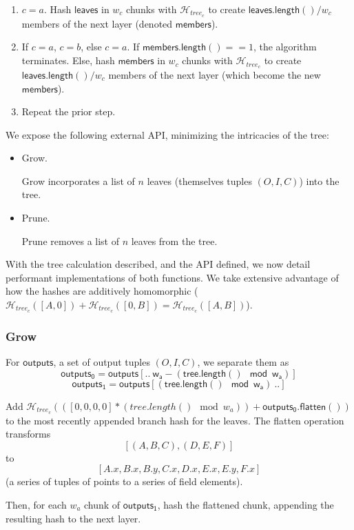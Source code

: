 \documentclass[]{article}
\begin{document}
\begin{enumerate}
	\item $c = a$. Hash $\mathsf{leaves}$ in $w_c$ chunks with $\mathcal{H}_{tree_c}$ to create $\mathsf{leaves.length()} / w_c$ members of the next layer (denoted $\mathsf{members}$).
	\item If $c = a$, $c = b$, else $c = a$. If $\mathsf{members.length()} == 1$, the algorithm terminates. Else, hash $\mathsf{members}$ in $w_c$ chunks with $\mathcal{H}_{tree_c}$ to create $\mathsf{leaves.length()} / w_c$ members of the next layer (which become the new $\mathsf{members}$).
	\item Repeat the prior step.
\end{enumerate}

We expose the following external API, minimizing the intricacies of the tree:

\begin{itemize}
  \item Grow.
  
  Grow incorporates a list of $n$ leaves (themselves tuples $(O, I, C)$) into the tree.
  \item Prune.

  Prune removes a list of $n$ leaves from the tree.
\end{itemize}

With the tree calculation described, and the API defined, we now detail performant implementations of both functions. We take extensive advantage of how the hashes are additively homomorphic ($\mathcal{H}_{tree_c}([A, 0]) + \mathcal{H}_{tree_c}([0, B]) = \mathcal{H}_{tree_c}([A, B])$).

\subsubsection{Grow}

For $\mathsf{outputs}$, a set of output tuples $(O, I, C)$, we separate them as
$$
\mathsf{outputs_0} = \mathsf{outputs[.. ~w_a - (tree.length() \mod w_a)]}
$$
$$
\mathsf{outputs_1} = \mathsf{outputs[(tree.length() \mod w_a) ~..]}
$$

Add $\mathcal{H}_{tree_c}(([0, 0, 0, 0] * (tree.length() \mod w_a)) + \mathsf{outputs_0.flatten()})$ to the most recently appended branch hash for the leaves. The flatten operation transforms $$[(A, B, C), (D, E, F)]$$ to $$[
A.x, B.x, B.y, C.x,
D.x, E.x, E.y, F.x
]$$
(a series of tuples of points to a series of field elements).

Then, for each $w_a$ chunk of $\mathsf{outputs_1}$, hash the flattened chunk, appending the resulting hash to the next layer.
\end{document}
